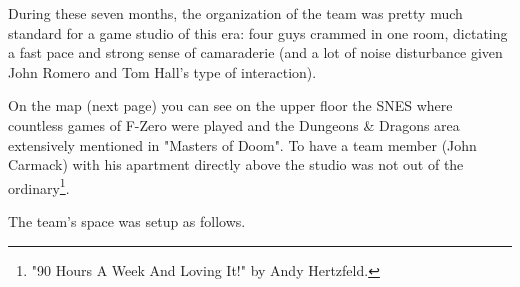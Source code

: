 \documentclass[book.tex]{subfiles}
\begin{document}
During these seven months, the organization of the team was pretty much standard for a game studio of this era: four guys crammed in one room, dictating a fast pace and strong sense of camaraderie (and a lot of noise disturbance given John Romero and Tom Hall's type of interaction).\\
\par On the map (next page) you can see on the upper floor the SNES where countless games of F-Zero were played and the Dungeons \& Dragons area extensively mentioned in "Masters of Doom". To have a team member (John Carmack) with his apartment directly above the studio was not out of the ordinary\footnote{ "90 Hours A Week And Loving It!" by Andy Hertzfeld.}.\\
\par
The team's space was setup as follows.
\end{document}
